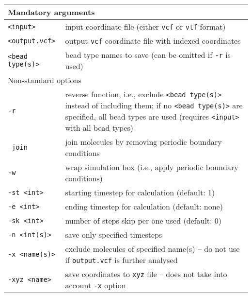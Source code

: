 \vspace{1em}
\noindent
\begin{longtable}{p{}p{}}
  \toprule
  \multicolumn{2}{l}{Mandatory arguments} \\
  \midrule
  \texttt{<input>} & input coordinate file (either \texttt{vcf} or
    \texttt{vtf} format) \\
  \texttt{<output.vcf>} & output \texttt{vcf} coordinate file with indexed
    coordinates \\
  \texttt{<bead type(s)>} & bead type names to save (can be omitted if
    \texttt{-r} is used) \\
  \toprule
  \multicolumn{2}{l}{Non-standard options} \\
  \midrule
  \texttt{-r} & reverse function, i.e., exclude \texttt{<bead type(s)>}
    instead of including them; if no \texttt{<bead type(s)>} are specified,
    all bead types are used (requires \texttt{<input>} with all bead types) \\
  \texttt{--join} & join molecules by removing periodic boundary conditions \\
  \texttt{-w} & wrap simulation box (i.e., apply periodic boundary conditions) \\
  \texttt{-st <int>} & starting timestep for calculation (default: 1) \\
  \texttt{-e <int>} & ending timestep for calculation (default: none) \\
  \texttt{-sk <int>} & number of steps skip per one used (default: 0) \\
  \texttt{-n <int(s)>} & save only specified timesteps \\
  \texttt{-x <name(s)>} & exclude molecules of specified name(s) -- do not
    use if \texttt{output.vcf} is further analysed \\
  \texttt{-xyz <name>} & save coordinates to \texttt{xyz} file -- does not
    take into account \texttt{-x} option \\
  \bottomrule
\end{longtable}

